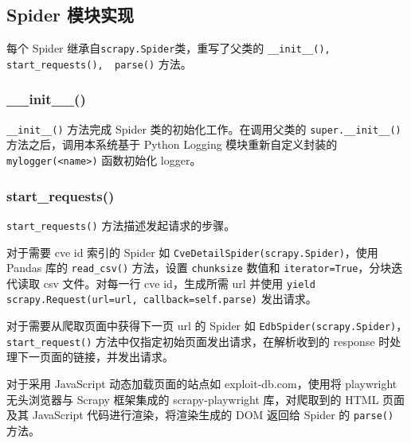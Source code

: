 \documentclass[a4paper,AutoFakeBold,oneside,12pt]{book}
\begin{document}
\subsection{Spider 模块实现}

每个 Spider 继承自\lstinline[style = python]|scrapy.Spider|类，重写了父类的 \lstinline[style = python]|__init__(), start_requests(),  parse()| 方法。

\subsubsection{{\_\_}init{\_\_}()}

\lstinline[style = python]|__init__()| 方法完成 Spider 类的初始化工作。在调用父类的 \lstinline|super.__init__()| 方法之后，调用本系统基于 Python Logging 模块重新自定义封装的 \lstinline[style = python]|mylogger(<name>)| 函数初始化 logger。

\subsubsection{start{\_}requests()}
\lstinline[style = python]|start_requests()| 方法描述发起请求的步骤。

对于需要 cve id 索引的 Spider 如 \lstinline[style = python]|CveDetailSpider(scrapy.Spider)|，使用 Pandas 库的 \lstinline[style = python]|read_csv()| 方法，设置 \verb|chunksize| 数值和 \verb|iterator=True|，分块迭代读取 csv 文件。对每一行 cve id，生成所需 url 并使用 \lstinline[style = python]|yield scrapy.Request(url=url, callback=self.parse)| 发出请求。

对于需要从爬取页面中获得下一页 url 的 Spider 如 \lstinline[style = python]|EdbSpider(scrapy.Spider)|，\linebreak \lstinline[style = python]|start_request()| 方法中仅指定初始页面发出请求，在解析收到的 response 时处理下一页面的链接，并发出请求。

对于采用 JavaScript 动态加载页面的站点如 exploit-db.com，使用将 playwright 无头浏览器与 Scrapy 框架集成的 scrapy-playwright 库，对爬取到的 HTML 页面及其 JavaScript 代码进行渲染，将渲染生成的 DOM 返回给 Spider 的 \lstinline[style = python]|parse()| 方法。
\end{document}
